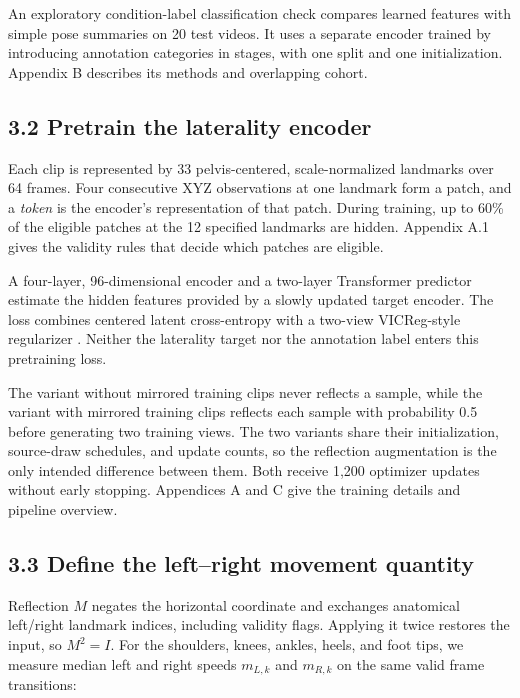 \documentclass{article}
\begin{document}
An exploratory condition-label classification check compares learned
features with simple pose summaries on 20 test videos. It uses a
separate encoder trained by introducing annotation categories in stages,
with one split and one initialization. Appendix B describes its methods
and overlapping cohort.

\subsection{3.2 Pretrain the laterality
encoder}\label{pretrain-the-laterality-encoder}

Each clip is represented by 33 pelvis-centered, scale-normalized
landmarks over 64 frames. Four consecutive XYZ observations at one
landmark form a patch, and a \emph{token} is the encoder's
representation of that patch. During training, up to 60\% of the
eligible patches at the 12 specified landmarks are hidden. Appendix A.1
gives the validity rules that decide which patches are eligible.

A four-layer, 96-dimensional encoder and a two-layer Transformer
predictor estimate the hidden features provided by a slowly updated
target encoder. The loss combines centered latent cross-entropy with a
two-view VICReg-style regularizer \citep{bardes2022vicreg}. Neither the
laterality target nor the annotation label enters this pretraining loss.

The variant without mirrored training clips never reflects a sample,
while the variant with mirrored training clips reflects each sample with
probability 0.5 before generating two training views. The two variants
share their initialization, source-draw schedules, and update counts, so
the reflection augmentation is the only intended difference between
them. Both receive 1,200 optimizer updates without early stopping.
Appendices A and C give the training details and pipeline overview.

\subsection{3.3 Define the left--right movement
quantity}\label{define-the-leftright-movement-quantity}

Reflection \(M\) negates the horizontal coordinate and exchanges
anatomical left/right landmark indices, including validity flags.
Applying it twice restores the input, so \(M^2=I\). For the shoulders,
knees, ankles, heels, and foot tips, we measure median left and right
speeds \(m_{L,k}\) and \(m_{R,k}\) on the same valid frame transitions:
\end{document}
